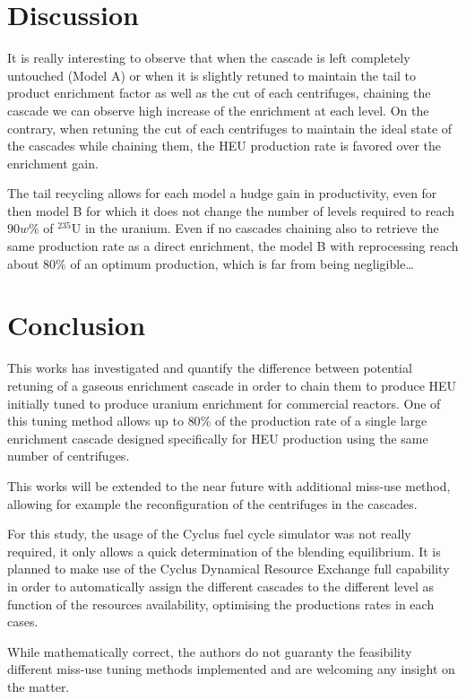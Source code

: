 \section{Discussion}

It is really interesting to observe that when the cascade is left completely
untouched (Model A) or when it is slightly retuned to maintain the tail to
product enrichment factor as well as the cut of each centrifuges, chaining the
cascade we can observe high increase of the enrichment at each level.  On the
contrary, when retuning the cut of each centrifuges to maintain the ideal state
of the cascades while chaining them, the \gls{HEU} production rate is favored
over the enrichment gain.

The tail recycling allows for each model a hudge gain in productivity, even for
then model B for which it does not change the number of levels required to reach
$90w\%$ of $^{235}$U in the uranium. Even if no cascades chaining also to
retrieve the same production rate as a direct enrichment, the model B with
reprocessing reach about $80\%$ of an optimum production, which is far from
being negligible\ldots


\section{Conclusion}

This works has investigated and quantify the difference between potential
retuning of a gaseous enrichment cascade in order to chain them to produce
\gls{HEU} initially tuned to produce uranium enrichment for commercial reactors.
One of this tuning method allows up to $80\%$ of the production rate of a single
large enrichment cascade designed specifically for \gls{HEU} production using
the same number of centrifuges.

This works will be extended to the near future with additional miss-use method,
allowing for example the reconfiguration of the centrifuges in the cascades.

For this study, the usage of the Cyclus fuel cycle simulator was not really
required, it only allows a quick determination of the blending equilibrium. It
is planned to make use of the Cyclus Dynamical Resource Exchange full capability
in order to automatically assign the different cascades to the different level
as function of the resources availability, optimising the productions rates in
each cases.

While mathematically correct, the authors do not guaranty the feasibility
different miss-use tuning methods implemented and are welcoming any insight on
the matter.


